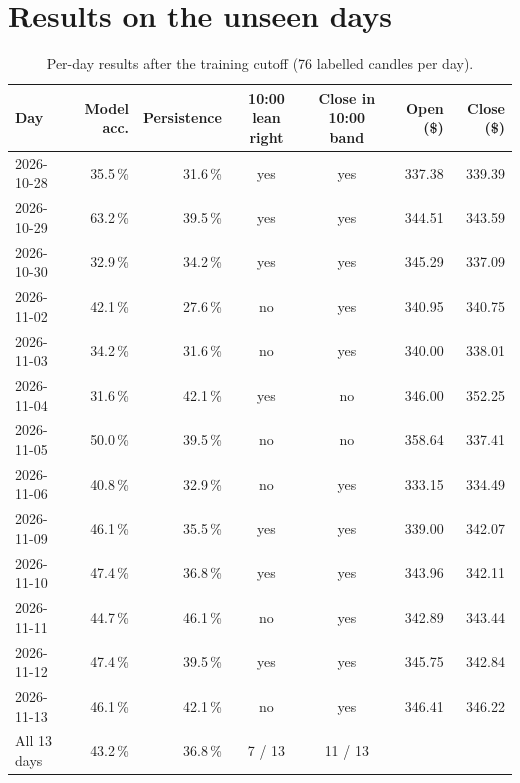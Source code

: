 \documentclass[11pt,a4paper]{article}
\begin{document}
\section{Results on the unseen days}
\label{app:holdout}
\begin{table}[H]
\centering\small
\caption{Per-day results after the training cutoff (76 labelled candles per day).}
\begin{tabular}{@{}l r r c c r r@{}}
\toprule
Day & Model acc. & Persistence & 10:00 lean right & Close in 10:00 band & Open (\$) & Close (\$) \\
\midrule
2026-10-28 & 35.5\,\% & 31.6\,\% & yes & yes & 337.38 & 339.39 \\
2026-10-29 & 63.2\,\% & 39.5\,\% & yes & yes & 344.51 & 343.59 \\
2026-10-30 & 32.9\,\% & 34.2\,\% & yes & yes & 345.29 & 337.09 \\
2026-11-02 & 42.1\,\% & 27.6\,\% & no  & yes & 340.95 & 340.75 \\
2026-11-03 & 34.2\,\% & 31.6\,\% & no  & yes & 340.00 & 338.01 \\
2026-11-04 & 31.6\,\% & 42.1\,\% & yes & no  & 346.00 & 352.25 \\
2026-11-05 & 50.0\,\% & 39.5\,\% & no  & no  & 358.64 & 337.41 \\
2026-11-06 & 40.8\,\% & 32.9\,\% & no  & yes & 333.15 & 334.49 \\
2026-11-09 & 46.1\,\% & 35.5\,\% & yes & yes & 339.00 & 342.07 \\
2026-11-10 & 47.4\,\% & 36.8\,\% & yes & yes & 343.96 & 342.11 \\
2026-11-11 & 44.7\,\% & 46.1\,\% & no  & yes & 342.89 & 343.44 \\
2026-11-12 & 47.4\,\% & 39.5\,\% & yes & yes & 345.75 & 342.84 \\
2026-11-13 & 46.1\,\% & 42.1\,\% & no  & yes & 346.41 & 346.22 \\
\midrule
All 13 days & 43.2\,\% & 36.8\,\% & 7 / 13 & 11 / 13 & & \\
\bottomrule
\end{tabular}
\end{table}
\end{document}
